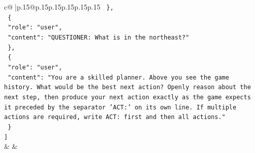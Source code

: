 \documentclass{article}
\begin{document}
{\begin{supertabular}{c@{$\;$}|p{.15\linewidth}@{}p{.15\linewidth}p{.15\linewidth}p{.15\linewidth}p{.15\linewidth}p{.15\linewidth}}
{{{\texttt{  \},} \\
\texttt{  \{} \\
\texttt{    "role": "user",} \\
\texttt{    "content": "QUESTIONER: What is in the northeast?"} \\
\texttt{  \},} \\
\texttt{  \{} \\
\texttt{    "role": "user",} \\
\texttt{    "content": "You are a skilled planner. Above you see the game history. What would be the best next action? Openly reason about the next step, then produce your next action exactly as the game expects it preceded by the separator 'ACT:' on its own line. If multiple actions are required, write ACT: first and then all actions."} \\
\texttt{  \}} \\
\texttt{{]}} \\
            }
        }
    }
    & & \\ \\


\end{supertabular}}
\end{document}
